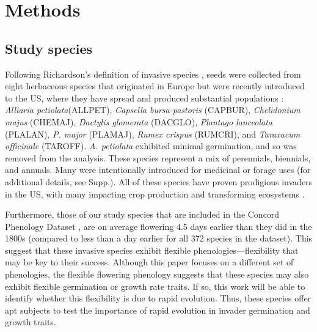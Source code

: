 \documentclass[12pt]{article}\usepackage[]{graphicx}\usepackage[]{color}
\begin{document}
	\section{Methods}
	\subsection{Study species}
	Following Richardson's definition of invasive species \parencite[][, see Supp. for details]{Richardson2000, Richardson2011}, seeds were collected from eight herbaceous species that originated in Europe but were recently introduced to the US, where they have spread and produced substantial populations \parencite{Uva1997}:\textit{ Alliaria petiolata}(ALLPET), \textit{Capsella bursa-pastoris} (CAPBUR), \textit{Chelidonium majus} (CHEMAJ), \textit{Dactylis glomerata} (DACGLO),  \textit{Plantago lanceolata} (PLALAN), \textit{P.  major} (PLAMAJ), \textit{Rumex crispus} (RUMCRI), and \textit{Taraxacum officinale} (TAROFF). \textit{A. petiolata} exhibited minimal germination, and so was removed from the analysis. These species represent a mix of perennials, biennials, and annuals. Many were intentionally introduced for medicinal or forage uses (for additional details, see Supp.).  All of these species have proven prodigious invaders in the US, with many impacting crop production and transforming ecosystems \parencite[e.g.,][]{Froese2003,Wolfe2008}. 

	Furthermore, those of our study species that are included in the Concord Phenology Dataset \parencite[ \textit{Capsella bursa-pastoris, Chelidonium majus, Plantago lanceolata}, and \textit{Rumex crispus},][]{Willis:2008bf}, are on average flowering 4.5 days earlier than they did in the 1800s (compared to less than a day earlier for all 372 species in the dataset). This suggest that these invasive species exhibit flexible phenologies---flexibility that may be key to their success. Although this paper focuses on a different set of phenologies, the flexible flowering phenology suggests that these species may also exhibit flexible germination or growth rate traits. If so, this work will be able to identify whether this flexibility is due to rapid evolution. Thus, these species offer apt subjects to test the importance of rapid evolution in invader germination and growth traits. 
\end{document}
